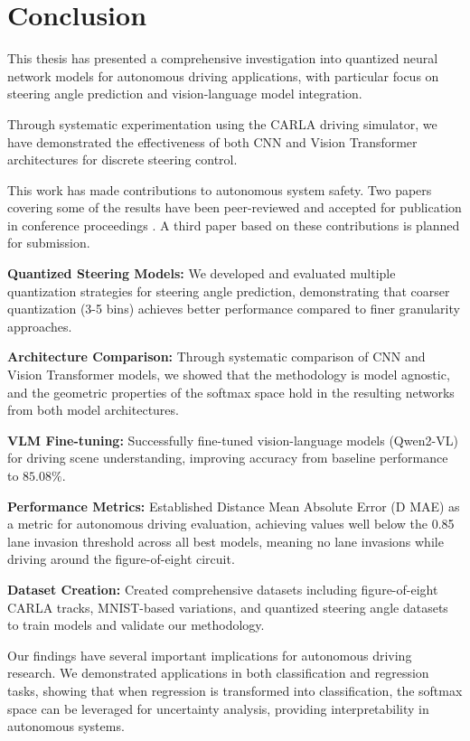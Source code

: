 \chapter{Conclusion}
\label{chap:conclusion}

This thesis has presented a comprehensive investigation into quantized neural network models for autonomous driving applications, with particular focus on steering angle prediction and vision-language model integration.

Through systematic experimentation using the CARLA driving simulator, we have demonstrated the effectiveness of both CNN and Vision Transformer architectures for discrete steering control.

This work has made contributions to autonomous system safety. Two papers covering some of the results have been peer-reviewed and accepted for publication in conference proceedings \citep{sikar2024misclassificationlikelihoodmatrixclasses, sikar2025explorationssoftmaxspaceknowing}. A third paper based on these contributions is planned for submission.

\textbf{Quantized Steering Models:} We developed and evaluated multiple quantization strategies for steering angle prediction, demonstrating that coarser quantization (3-5 bins) achieves better performance compared to finer granularity approaches.

\textbf{Architecture Comparison:} Through systematic comparison of CNN and Vision Transformer models, we showed that the methodology is model agnostic, and the geometric properties of the softmax space hold in the resulting networks from both model architectures.

\textbf{VLM Fine-tuning:} Successfully fine-tuned vision-language models (Qwen2-VL) for driving scene understanding, improving accuracy from baseline performance to $85.08\%$.

\textbf{Performance Metrics:} Established Distance Mean Absolute Error (D MAE) as a metric for autonomous driving evaluation, achieving values well below the 0.85 lane invasion threshold across all best models, meaning no lane invasions while driving around the figure-of-eight circuit.

\textbf{Dataset Creation:} Created comprehensive datasets including figure-of-eight CARLA tracks, MNIST-based variations, and quantized steering angle datasets to train models and validate our methodology.

Our findings have several important implications for autonomous driving research. We demonstrated applications in both classification and regression tasks, showing that when regression is transformed into classification, the softmax space can be leveraged for uncertainty analysis, providing interpretability in autonomous systems.

